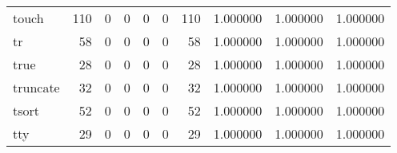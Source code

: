 \begin{tabular}{lrrrrrrrrr}
touch     &                                       110 &                                                  0 &                                                  0 &                                                  0 &                                                  0 &                                                110 &                                           1.000000 &                               1.000000 &                             1.000000 \\
tr        &                                        58 &                                                  0 &                                                  0 &                                                  0 &                                                  0 &                                                 58 &                                           1.000000 &                               1.000000 &                             1.000000 \\
true      &                                        28 &                                                  0 &                                                  0 &                                                  0 &                                                  0 &                                                 28 &                                           1.000000 &                               1.000000 &                             1.000000 \\
truncate  &                                        32 &                                                  0 &                                                  0 &                                                  0 &                                                  0 &                                                 32 &                                           1.000000 &                               1.000000 &                             1.000000 \\
tsort     &                                        52 &                                                  0 &                                                  0 &                                                  0 &                                                  0 &                                                 52 &                                           1.000000 &                               1.000000 &                             1.000000 \\
tty       &                                        29 &                                                  0 &                                                  0 &                                                  0 &                                                  0 &                                                 29 &                                           1.000000 &                               1.000000 &                             1.000000 \\

\end{tabular}
